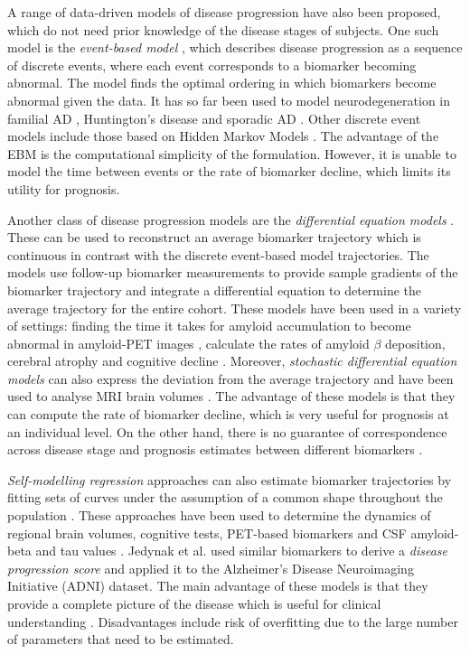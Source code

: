A range of data-driven models of disease progression have also been proposed, which do not need prior knowledge of the disease stages of subjects. One such model is the \emph{event-based model}  \cite{fonteijn2012event}, which describes disease progression as a sequence of discrete events, where each event corresponds to a biomarker becoming abnormal. The model finds the optimal ordering in which biomarkers become abnormal given the data. It has so far been used to model neurodegeneration in familial AD \cite{fonteijn2012event}, Huntington's disease \cite{fonteijn2012event} and sporadic AD \cite{young2014data}. Other discrete event models include those based on Hidden Markov Models \cite{jackson2003multistate, guihenneuc2000modeling}. The advantage of the EBM is the computational simplicity of the formulation. However, it is unable to model the time between events or the rate of biomarker decline, which limits its utility for prognosis. 

Another class of disease progression models are the \emph{differential equation models} \cite{villemagne2013amyloid,oxtoby2014learning,ashford2001modeling,yang2010quantifying,sabuncu2011dynamics,jack2013brain}. These can be used to reconstruct an average biomarker trajectory which is continuous in contrast with the discrete event-based model trajectories. The models use follow-up biomarker measurements to provide sample gradients of the biomarker trajectory and integrate a differential equation to determine the average trajectory for the entire cohort. These models have been used in a variety of settings: finding the time it takes for amyloid accumulation to become abnormal in amyloid-PET images \cite{jack2013brain}, calculate the rates of amyloid $\beta$ deposition, cerebral atrophy and cognitive decline \cite{villemagne2013amyloid}. Moreover, \emph{stochastic differential equation models} can also express the deviation from the average trajectory and have been used to analyse MRI brain volumes \cite{oxtoby2014learning}. The advantage of these models is that they can compute the rate of biomarker decline, which is very useful for prognosis at an individual level. On the other hand, there is no guarantee of correspondence across disease stage and prognosis estimates between different biomarkers \cite{Young2015data}. 

\emph{Self-modelling regression} approaches can also estimate biomarker trajectories by fitting sets of curves under the assumption of a common shape throughout the population \cite{donohue2014estimating}. These approaches have been used to determine the dynamics of regional brain volumes, cognitive tests, PET-based biomarkers and CSF amyloid-beta and tau values \cite{donohue2014estimating}. Jedynak et al. \cite{jedynak2012computational} used similar biomarkers to derive a \emph{disease progression score} and applied it to the Alzheimer's Disease Neuroimaging Initiative (ADNI) dataset. The main advantage of these models is that they provide a complete picture of the disease which is useful for clinical understanding \cite{Young2015data}. Disadvantages include risk of overfitting due to the large number of parameters that need to be estimated.

